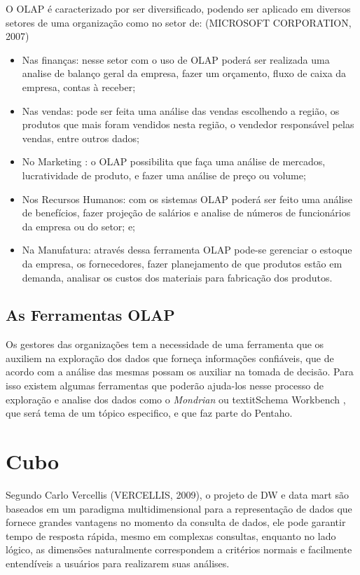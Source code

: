 O OLAP é caracterizado por ser diversificado, podendo ser aplicado em diversos setores de uma organização como no setor de: (MICROSOFT CORPORATION, 2007)

\begin{itemize}

    \item Nas finanças: nesse setor com o uso de OLAP poderá ser realizada uma analise de balanço geral da empresa, fazer um orçamento, fluxo de caixa da empresa, contas à receber;
    \item Nas vendas: pode ser feita uma análise das vendas escolhendo a região, os produtos que mais foram vendidos nesta região, o vendedor responsável pelas vendas, entre outros dados;
    \item No Marketing : o OLAP possibilita que faça uma análise de mercados, lucratividade de produto, e fazer uma análise de preço ou volume;
    \item Nos Recursos Humanos: com os sistemas OLAP poderá ser feito uma análise de benefícios, fazer projeção de salários e analise de números de funcionários da empresa ou do setor; e;
    \item Na Manufatura: através dessa ferramenta OLAP pode-se gerenciar o estoque da empresa, os fornecedores, fazer planejamento de que produtos estão em demanda, analisar os custos dos materiais para fabricação dos produtos.

\end{itemize}

\subsection{As Ferramentas OLAP}

Os gestores das organizações tem a necessidade de uma ferramenta que os auxiliem na exploração dos dados que forneça informações confiáveis, que de acordo com a análise das mesmas possam os auxiliar na tomada de decisão. Para isso existem algumas ferramentas que poderão ajuda-los nesse processo de exploração e analise dos dados como o \textit{Mondrian} ou textit{Schema Workbench} , que ser\'{a} tema de um tópico especifico, e que faz parte do Pentaho.

\section{Cubo}

Segundo Carlo Vercellis (VERCELLIS, 2009), o projeto de DW e data mart são baseados em um paradigma multidimensional para a representação de dados que fornece grandes vantagens no momento da consulta de dados, ele pode garantir tempo de resposta rápida, mesmo em complexas consultas, enquanto no lado lógico, as dimensões naturalmente correspondem a critérios normais e facilmente entendíveis a usuários para realizarem suas análises.

